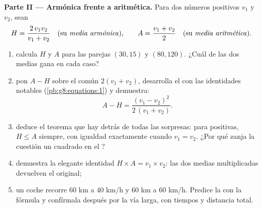 \begin{problem}
\medskip
\noindent\textbf{Parte II --- Armónica frente a aritmética.}
Para dos números positivos $v_1$ y $v_2$, sean
\[
H = \frac{2\, v_1 v_2}{v_1 + v_2}
\quad\text{(su \emph{media armónica}),}
\qquad
A = \frac{v_1 + v_2}{2}
\quad\text{(su \emph{media aritmética}).}
\]
\begin{enumerate}[resume]
  \item calcula $H$ y $A$ para las parejas $(30, 15)$ y
        $(80, 120)$. ¿Cuál de las dos medias gana en cada caso?
  \item pon $A - H$ sobre el  común $2(v_1 + v_2)$,
        desarrolla el  con las identidades notables
        (\cref{pb:g8:equations:1}) y demuestra:
        \[
        A - H = \frac{(v_1 - v_2)^2}{2\,(v_1 + v_2)} .
        \]
  \item deduce el teorema que hay detrás de todas las sorpresas: para 
        positivas, $H \leq A$ siempre, con igualdad exactamente cuando
        $v_1 = v_2$. ¿Por qué zanja la cuestión un cuadrado en el ?
  \item demuestra la elegante identidad $H \times A = v_1 \times v_2$:
        las dos medias multiplicadas devuelven el  original;
  \item un coche recorre $60$ km a $40$ km/h y $60$ km a
        $60$ km/h. Predice la  con la fórmula
        y confírmala después por la vía larga, con tiempos y distancia
        total.
\end{enumerate}


\end{problem}
